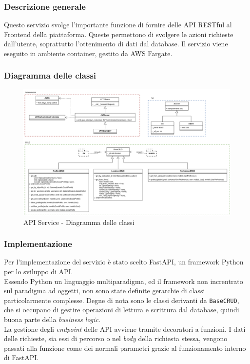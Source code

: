 \subsubsection{Descrizione generale}
Questo servizio svolge l'importante funzione di fornire delle API RESTful al Frontend della piattaforma.
Queste permettono di svolgere le azioni richieste dall'utente, soprattutto l'ottenimento di dati dal database.
Il servizio viene eseguito in ambiente container, gestito da AWS Fargate.

\subsubsection{Diagramma delle classi}
\begin{figure}[H]
    \includegraphics[width=16cm]{sezioni/images/cd_api.png}
    \centering
    \caption{API Service - Diagramma delle classi}
\end{figure}

\subsubsection{Implementazione}
Per l'implementazione del servizio è stato scelto FastAPI, un framework Python per lo sviluppo di API.\\
Essendo Python un linguaggio multiparadigma, ed il framework non increntrato sul paradigma ad oggetti, non sono state definite gerarchie di classi particolarmente complesse.
Degne di nota sono le classi derivanti da \verb|BaseCRUD|, che si occupano di gestire operazioni
di lettura e scrittura dal database, quindi buona parte della \textit{business logic}.\\
La gestione degli \textit{endpoint} delle API avviene tramite decoratori a funzioni.
I dati delle richieste, sia essi di percorso o nel \textit{body} della richiesta stessa, vengono passati alla funzione come dei normali parametri grazie al funzionamento interno di FastAPI.

